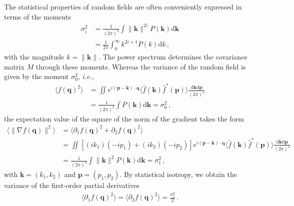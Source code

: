 \documentclass[a4paper, 11pt]{article}
\begin{document}
The statistical properties of random fields are often conveniently expressed in terms of the moments
\begin{align}
\sigma_i^2 &= \frac{1}{(2\pi)^2} \int \|\bm{k}\|^{2i}P(\bm{k})\mathrm{d}\bm{k}\nonumber\\
&= \frac{1}{2\pi} \int_0^\infty k^{2i+1}P(k)\mathrm{d}k\,,
\end{align}
with the magnitude $k = \|\bm{k}\|$. The power spectrum determines the covariance matrix $M$ through these moments. Whereas the variance of the random field is given by the moment $\sigma_0^2$, \textit{i.e.},
\begin{align}
\langle f(\bm{q})^2 \rangle &= \iint e^{i (\bm{p} - \bm{k})\cdot \bm{q}} \langle \hat{f}(\bm{k})\hat{f}^*(\bm{p})\rangle \frac{\mathrm{d}\bm{k}\mathrm{d}\bm{p}}{(2\pi)^4}\nonumber\\
&=\frac{1}{(2\pi)^2}\int P(\bm{k})\mathrm{d}\bm{k}=\sigma_0^2\,,
\end{align}
the expectation value of the square of the norm of the gradient takes the form
\begin{align}
\langle \|\nabla f(\bm{q})\|^2\rangle &= \langle \partial_1f(\bm{q})^2 + \partial_2 f(\bm{q})^2 \rangle \nonumber \\
&= \iint [(ik_1)(-ip_1)+(ik_2)(-ip_2)] e^{i (\bm{p} - \bm{k})\cdot \bm{q}} \langle \hat{f}(\bm{k})\hat{f}^*(\bm{p})\rangle \frac{\mathrm{d}\bm{k}\mathrm{d}\bm{p}}{(2\pi)^4}\nonumber \\
&=\frac{1}{(2\pi)^2}\int \|\bm{k}\|^2 P(\bm{k})\mathrm{d}\bm{k}=\sigma_1^2\,,
\end{align}
with $\bm{k}=(k_1,k_2)$ and $\bm{p}=(p_1,p_2)$. By statistical isotropy, we obtain the variance of the first-order partial derivatives
\begin{align}
\langle \partial_1 f(\bm{q})^2\rangle =\langle \partial_2 f(\bm{q})^2\rangle =\frac{\sigma_1^2}{2}\,.
\end{align}

\bigskip
\end{document}
